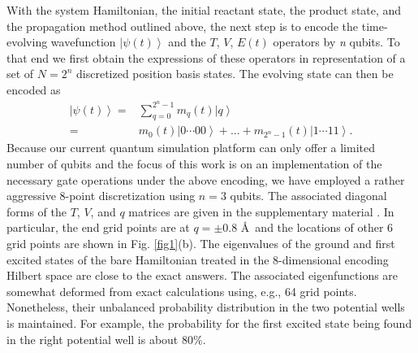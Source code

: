 \documentclass[prl,twocolumn,showpacs]{revtex4}
\newcommand{\nl}{\nonumber \\}
\begin{document}
With the system Hamiltonian, the initial reactant state, the product state, and the propagation method outlined above, the next step is
to encode the time-evolving wavefunction $\left\vert \psi({t}) \right\rangle$ and the $T$, $V$, $E(t)$ operators by \emph{n} qubits. To that end
we first obtain the expressions of these operators in representation of a set of $N=2^n$ discretized position basis states.
The evolving state can then be encoded as
\begin{align}\label{wave}
\left\vert \psi(t) \right\rangle=&\sum_{q=0}^{2^n-1}m_q(t)\left\vert q \right\rangle
\nl =&m_0(t)\left\vert 0\cdots00 \right\rangle+...+m_{2^n-1}(t)\left\vert 1\cdots11 \right\rangle.
\end{align}
Because our current quantum simulation platform can only offer a limited number of qubits
and the focus of this work is on an
implementation of the necessary gate operations under the above encoding, we have employed
a rather aggressive 8-point discretization using $n=3$ qubits.  The associated diagonal forms of the
$T$, $V$, and $q$ matrices are
given in the supplementary material \cite{supplement}. In particular,
the end grid points are at $q=\pm 0.8$ \AA\, and the locations of other 6 grid points are shown in Fig. \ref{fig1}(b).
The eigenvalues of the ground and first excited states of the bare Hamiltonian
treated in the 8-dimensional encoding Hilbert space are close to the exact answers. The
associated eigenfunctions are somewhat deformed from exact calculations using, e.g., 64 grid points.
Nonetheless, their unbalanced probability distribution in the two potential wells is maintained.
For example, the probability for the first excited state being found in the right potential well is about $80\%$.
\end{document}
